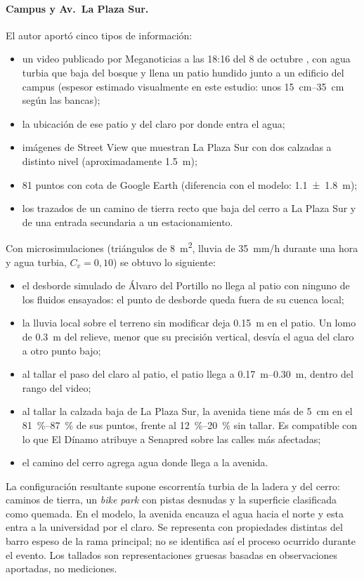 \paragraph{Campus y Av.\ La Plaza Sur.} El autor aportó cinco tipos de información:
\begin{itemize}
\item un video publicado por Meganoticias a las 18:16 del 8 de octubre \citep{meganoticias2026uandes}, con agua turbia que baja del bosque y llena un patio hundido junto a un edificio del campus (espesor estimado visualmente en este estudio: unos \SIrange{15}{35}{cm} según las bancas);
\item la ubicación de ese patio y del claro por donde entra el agua;
\item imágenes de Street View que muestran La Plaza Sur con dos calzadas a distinto nivel (aproximadamente \SI{1,5}{m});
\item 81 puntos con cota de Google Earth (diferencia con el modelo: \SI[uncertainty-mode=separate,retain-explicit-plus=true]{+1,1 +- 1,8}{m});
\item los trazados de un camino de tierra recto que baja del cerro a La Plaza Sur y de una entrada secundaria a un estacionamiento.
\end{itemize}
Con microsimulaciones (triángulos de \SI{8}{m^2}, lluvia de \SI{35}{mm/h} durante una hora y agua turbia, $C_v=0{,}10$) se obtuvo lo siguiente:
\begin{itemize}
\item el desborde simulado de Álvaro del Portillo no llega al patio con ninguno de los fluidos ensayados: el punto de desborde queda fuera de su cuenca local;
\item la lluvia local sobre el terreno sin modificar deja \SI{0,15}{m} en el patio. Un lomo de \SI{0,3}{m} del relieve, menor que su precisión vertical, desvía el agua del claro a otro punto bajo;
\item al tallar el paso del claro al patio, el patio llega a \SIrange{0,17}{0,30}{m}, dentro del rango del video;
\item al tallar la calzada baja de La Plaza Sur, la avenida tiene más de \SI{5}{cm} en el \SIrange{81}{87}{\percent} de sus puntos, frente al \SIrange{12}{20}{\percent} sin tallar. Es compatible con lo que El Dínamo atribuye a Senapred sobre las calles más afectadas;
\item el camino del cerro agrega agua donde llega a la avenida.
\end{itemize}
La configuración resultante supone escorrentía turbia de la ladera y del cerro: caminos de tierra, un \emph{bike park} con pistas desnudas y la superficie clasificada como quemada. En el modelo, la avenida encauza el agua hacia el norte y esta entra a la universidad por el claro. Se representa con propiedades distintas del barro espeso de la rama principal; no se identifica así el proceso ocurrido durante el evento. Los tallados son representaciones gruesas basadas en observaciones aportadas, no mediciones.


